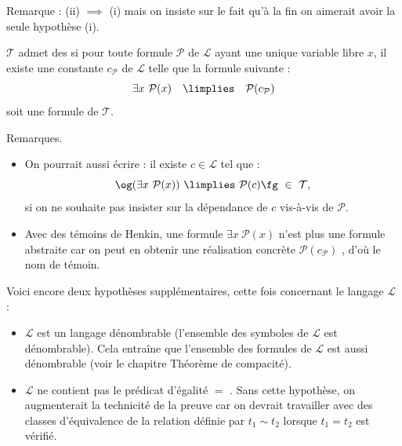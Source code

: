 \documentclass[11pt,class=report,crop=false]{standalone}
\begin{document}
Remarque : (ii) $\implies$ (i) mais on insiste sur le fait qu'à la fin on aimerait avoir la seule hypothèse (i).

\begin{definition}
	$\mathcal{T}$ admet des  si pour toute formule $\mathcal{P}$ de $\mathcal{L}$ ayant une unique variable libre $x$, il existe une constante $c_{\mathcal{P}}$ de $\mathcal{L}$ telle que la formule suivante :
	\[ \exists x \ \mathcal{P}(x) \quad \limplies \quad \mathcal{P}(c_{\mathcal{P}}) \]
	soit une formule de $\mathcal{T}$.
\end{definition}

Remarques.
\begin{itemize}
	
	\item On pourrait aussi écrire : il existe $c \in \mathcal{L}$ tel que :
	 \[
	 \text{\og}(\exists x\ \mathcal{P}(x)) \ \limplies \  \mathcal{P}(c)\text{\fg} \ \in \ \mathcal{T},
	 \]
	 si on ne souhaite pas insister sur la dépendance de $c$ vis-à-vis de $\mathcal{P}$.
	
	\item Avec des témoins de Henkin, une formule \og{}$\exists x \ \mathcal{P}(x)$\fg{} n'est plus une formule abstraite car on peut en obtenir une réalisation concrète \og{}$\mathcal{P}(c_{\mathcal{P}})$ \fg{}, d'où le nom de \og{}témoin\fg{}.
\end{itemize}


\bigskip

Voici encore deux hypothèses supplémentaires, cette fois concernant le langage $\mathcal{L}$ :
\begin{itemize}
	\item[(iv)] $\mathcal{L}$ est un langage dénombrable (l'ensemble des symboles de $\mathcal{L}$ est dénombrable). Cela entraîne que l'ensemble des formules de $\mathcal{L}$ est aussi dénombrable (voir le chapitre \og{}Théorème de compacité\fg{}).
	\item[(v)] $\mathcal{L}$ ne contient pas le prédicat d'égalité \og{}$=$ \fg{}. Sans cette hypothèse, on augmenterait la technicité de la preuve car on devrait travailler avec des classes d'équivalence de la relation définie par $t_1 \sim t_2$ lorsque $t_1 = t_2$ est vérifié.
\end{itemize}
\end{document}
